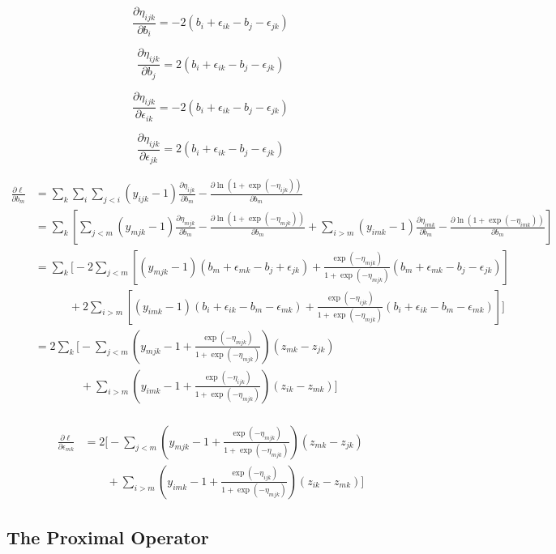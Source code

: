 \documentclass{article}
\begin{document}
\[
\frac{\partial \eta_{ijk}}{\partial b_{i}} =  - 2(b_i + \epsilon_{ik} - b_j - \epsilon_{jk})
\]

\[
\frac{\partial \eta_{ijk}}{\partial b_{j}} = 2(b_i + \epsilon_{ik} - b_j - \epsilon_{jk})
\]

\[
\frac{\partial \eta_{ijk}}{\partial \epsilon_{ik}} = - 2(b_i + \epsilon_{ik} - b_j - \epsilon_{jk})
\]

\[
\frac{\partial \eta_{ijk}}{\partial \epsilon_{jk}} = 2(b_i + \epsilon_{ik} - b_j - \epsilon_{jk})
\]

\begin{align*}
\frac{\partial \ell}{\partial b_{m}} & =  \sum_k \sum_{i}  \sum_{j<i} (y_{ijk} -1)\frac{\partial \eta_{ijk}}{\partial b_{m}} - \frac{\partial \ln (1+\exp(-\eta_{ijk}))}{\partial b_{m}} \\
& =  \sum_k\left[ \sum_{j<m} (y_{mjk} -1)\frac{\partial \eta_{mjk}}{\partial b_{m}} - \frac{\partial \ln (1+\exp(-\eta_{mjk}))}{\partial b_{m}} +  \sum_{i > m} (y_{imk} -1)\frac{\partial \eta_{imk}}{\partial b_{m}} - \frac{\partial \ln (1+\exp(-\eta_{imk}))}{\partial b_{m}} \right] \\
%
& =  \sum_k\bigg[ -2 \sum_{j<m} \left[(y_{mjk} -1)(b_m + \epsilon_{mk} - b_j + \epsilon_{jk}) + \frac{\exp(-\eta_{mjk})}{1+\exp(-\eta_{mjk})}(b_m + \epsilon_{mk} - b_j - \epsilon_{jk}) \right] \\
& \quad\quad\quad +  2 \sum_{i > m} \left[(y_{imk} -1)(b_i + \epsilon_{ik} - b_m - \epsilon_{mk}) +\frac{\exp(-\eta_{ijk})}{1+\exp(-\eta_{mjk})}(b_i + \epsilon_{ik} - b_m - \epsilon_{mk}) \right] \bigg] \\
& =  2 \sum_k\bigg[ - \sum_{j<m} \left(y_{mjk} -1 + \frac{\exp(-\eta_{mjk})}{1+\exp(-\eta_{mjk})}\right)(z_{mk} - z_{jk})\\
& \quad\quad\quad\quad +  \sum_{i > m} \left(y_{imk} -1 + \frac{\exp(-\eta_{ijk})}{1+\exp(-\eta_{mjk})}\right)(z_{ik} - z_{mk}) \bigg] \\
%
\end{align*}

\begin{align*}
\frac{\partial \ell}{\partial \epsilon_{mk}} & = 2 \bigg[ - \sum_{j<m} \left(y_{mjk} -1 + \frac{\exp(-\eta_{mjk})}{1+\exp(-\eta_{mjk})}\right)(z_{mk} - z_{jk})\\
& \quad\quad +  \sum_{i > m} \left(y_{imk} -1 + \frac{\exp(-\eta_{ijk})}{1+\exp(-\eta_{mjk})}\right)(z_{ik} - z_{mk}) \bigg]
\end{align*}

\subsection{The Proximal Operator}
\end{document}
